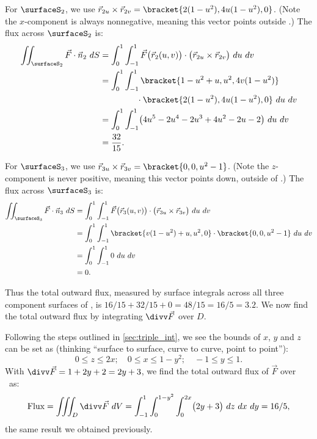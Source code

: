 \begin{example}
For $\surfaceS_2$, we use $\vec r_{2u}\times\vec r_{2v} =\bracket{2(1-u^2), 4u(1-u^2),0}$. (Note the $x$-component is always nonnegative, meaning this vector points outside \surfaceS.) The flux across $\surfaceS_2$ is:
\begin{align*}
	\iint_{\surfaceS_2} \vec F\cdot \vec n_2\ dS
	&= \int_0^1\int_{-1}^1 \vec F\bigl(\vec r_2(u,v)\bigr)\cdot \bigl(\vec r_{2u}\times\vec r_{2v}\bigr)\ du\ dv\\
	&= \int_0^1\int_{-1}^1\bracket{1-u^2+u, u^2, 4v(1-u^2)}\\
	&\hphantom{=\int_0^1\int_{-1}^1}\cdot\bracket{2(1-u^2), 4u(1-u^2),0}\ du\ dv\\
	&= \int_0^1\int_{-1}^1 \bigl(4u^5-2u^4-2u^3+4u^2-2u-2\bigr)\ du\ dv\\
	&= \frac{32}{15}.
\end{align*}

For $\surfaceS_3$, we use $\vec r_{3u}\times\vec r_{3v} =\bracket{0,0,u^2-1}$. (Note the $z$-component is never positive, meaning this vector points down, outside of \surfaceS.) The flux across $\surfaceS_3$ is:
\begin{align*}
	\iint_{\surfaceS_3} \vec F\cdot \vec n_3\ dS
	&= \int_0^1\int_{-1}^1 \vec F\bigl(\vec r_3(u,v)\bigr)\cdot \bigl(\vec r_{3u}\times\vec r_{3v}\bigr)\ du\ dv\\
	&= \int_0^1\int_{-1}^1\bracket{v(1-u^2)+u,u^2,0}\cdot\bracket{0,0,u^2-1}\ du\ dv\\
	&= \int_0^1\int_{-1}^1 0\ du\ dv\\
	&= 0.
\end{align*}

Thus the total outward flux, measured by surface integrals across all three component surfaces of \surfaceS, is $16/15+32/15+0 = 48/15 = 16/5 = 3.2$. We now find the total outward flux by integrating $\divv \vec F$ over $D$.

Following the steps outlined in \autoref{sec:triple_int}, we see the bounds of $x$, $y$ and $z$ can be set as (thinking ``surface to surface, curve to curve, point to point''):
\[0\leq z\leq 2x;\quad 0\leq x\leq 1-y^2;\quad -1\leq y\leq 1.\]
With $\divv \vec F = 1+2y+2 = 2y+3$, we find the total outward flux of $\vec F$ over \surfaceS\ as:
\[
\text{Flux} = \iiint_D\divv \vec F\ dV
= \int_{-1}^1\int_0^{1-y^2}\int_0^{2x}\bigl(2y+3\bigr)\ dz\ dx\ dy = 16/5,
\]
the same result we obtained previously.
\end{example}

